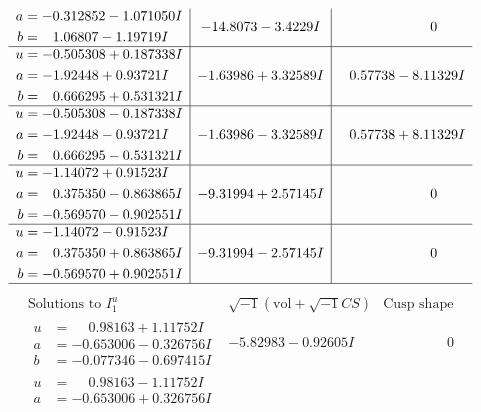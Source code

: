 \documentclass[1p]{elsarticle_modified}
\theoremstyle{definition}
\newcommand{\I}{\sqrt{-1}}
\begin{document}
$$\begin{array}{c|c|c}
\begin{aligned}
a &= -0.312852 - 1.071050 I \\
b &= \phantom{-}1.06807 - 1.19719 I\end{aligned}
 & -14.8073 - 3.4229 I & \phantom{-0.000000 } 0 \\ \hline\begin{aligned}
u &= -0.505308 + 0.187338 I \\
a &= -1.92448 + 0.93721 I \\
b &= \phantom{-}0.666295 + 0.531321 I\end{aligned}
 & -1.63986 + 3.32589 I & \phantom{-}0.57738 - 8.11329 I \\ \hline\begin{aligned}
u &= -0.505308 - 0.187338 I \\
a &= -1.92448 - 0.93721 I \\
b &= \phantom{-}0.666295 - 0.531321 I\end{aligned}
 & -1.63986 - 3.32589 I & \phantom{-}0.57738 + 8.11329 I \\ \hline\begin{aligned}
u &= -1.14072 + 0.91523 I \\
a &= \phantom{-}0.375350 - 0.863865 I \\
b &= -0.569570 - 0.902551 I\end{aligned}
 & -9.31994 + 2.57145 I & \phantom{-0.000000 } 0 \\ \hline\begin{aligned}
u &= -1.14072 - 0.91523 I \\
a &= \phantom{-}0.375350 + 0.863865 I \\
b &= -0.569570 + 0.902551 I\end{aligned}
 & -9.31994 - 2.57145 I & \phantom{-0.000000 } 0\\
 \hline 
 \end{array}$$\newpage$$\begin{array}{c|c|c}  
\text{Solutions to }I^u_{1}& \I (\text{vol} + \sqrt{-1}CS) & \text{Cusp shape}\\
 \hline 
\begin{aligned}
u &= \phantom{-}0.98163 + 1.11752 I \\
a &= -0.653006 - 0.326756 I \\
b &= -0.077346 - 0.697415 I\end{aligned}
 & -5.82983 - 0.92605 I & \phantom{-0.000000 } 0 \\ \hline\begin{aligned}
u &= \phantom{-}0.98163 - 1.11752 I \\
a &= -0.653006 + 0.326756 I \\

\end{aligned}
\end{array}$$
\end{document}
